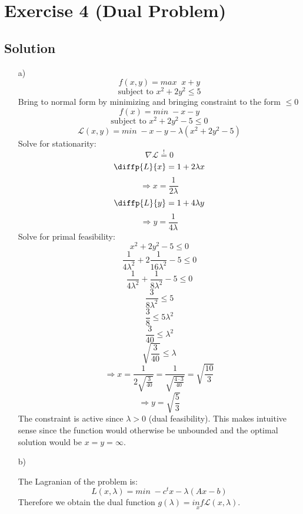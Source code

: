 \documentclass[10pt]{article}
\numberwithin{equation}{section}
\begin{document}
\section*{Exercise 4 (Dual Problem)}
\subsection*{Solution}
\begin{enumerate}
\item[a)]{
    $$ f(x, y) = max\;\; x+y$$
    $$\text{subject to } x^2 +2y^2 \leq 5$$
    Bring to normal form by minimizing and bringing constraint to the form $\leq 0$
    $$ f(x) = min\;  -x-y$$
    $$\text{subject to } x^2 + 2y^2 - 5 \leq 0$$
    $$\mathcal{L}(x,y) = min\; -x-y - \lambda (x^2 + 2y^2 -5)$$
    Solve for stationarity: 
    $$\nabla \mathcal{L} \overset{!}{=} 0$$
    $$\diffp{L}{x} = 1 + 2\lambda x$$
    $$\Rightarrow x  = \frac{1}{2\lambda}$$
    $$\diffp{L}{y} = 1 + 4\lambda y$$
    $$\Rightarrow y  = \frac{1}{4\lambda}$$
    Solve for primal feasibility:
    $$x^2 + 2y^2 -5 \leq 0$$
    $$\frac{1}{4\lambda^2} + 2\frac{1}{16\lambda^2} -5 \leq 0$$
    $$\frac{1}{4\lambda^2} + \frac{1}{8\lambda^2} -5 \leq 0$$
    $$\frac{3}{8\lambda^2}  \leq 5$$
    $$\frac{3}{8}  \leq 5\lambda^2$$
    $$\frac{3}{40}  \leq \lambda^2$$
    $$\sqrt{\frac{3}{40}} \leq \lambda$$
    $$\Rightarrow x = \frac{1}{2\sqrt{\frac{3}{40}}} = \frac{1}{\sqrt{\frac{4  \cdot 3}{40}}}= \sqrt{\frac{10}{3}}$$
    $$ \Rightarrow y = \sqrt{\frac{5}{3}}$$
    The constraint is active since $\lambda > 0$ (dual feasibility).
    This makes intuitive sense since the function would otherwise be unbounded and the optimal solution would be $x = y = \infty$.
}
\item[b)]{
    The Lagranian of the problem is:
    $$L(x,\lambda) = min \; -c^t x - \lambda (Ax-b)$$
    Therefore we obtain the dual function $g(\lambda) = \underset{x}{inf} \mathcal{L}(x,\lambda)$.
    

}
\end{enumerate}
\end{document}
